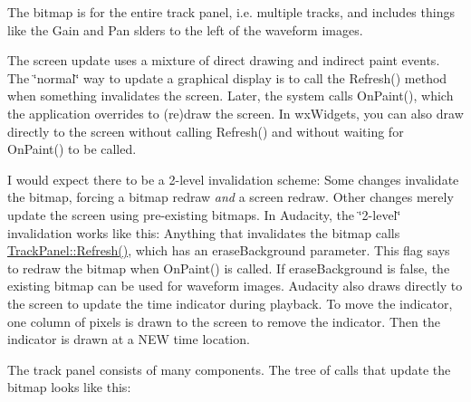 The bitmap is for the entire track panel, i.\+e. multiple tracks, and includes things like the Gain and Pan slders to the left of the waveform images.

The screen update uses a mixture of direct drawing and indirect paint events. The \char`\"{}normal\char`\"{} way to update a graphical display is to call the Refresh() method when something invalidates the screen. Later, the system calls On\+Paint(), which the application overrides to (re)draw the screen. In wx\+Widgets, you can also draw directly to the screen without calling Refresh() and without waiting for On\+Paint() to be called.

I would expect there to be a 2-\/level invalidation scheme\+: Some changes invalidate the bitmap, forcing a bitmap redraw {\itshape and} a screen redraw. Other changes merely update the screen using pre-\/existing bitmaps. In Audacity, the \char`\"{}2-\/level\char`\"{} invalidation works like this\+: Anything that invalidates the bitmap calls \hyperlink{class_track_panel_ae81fd0fd442170965441800734fcf212}{Track\+Panel\+::\+Refresh()}, which has an erase\+Background parameter. This flag says to redraw the bitmap when On\+Paint() is called. If erase\+Background is false, the existing bitmap can be used for waveform images. Audacity also draws directly to the screen to update the time indicator during playback. To move the indicator, one column of pixels is drawn to the screen to remove the indicator. Then the indicator is drawn at a N\+EW time location.

The track panel consists of many components. The tree of calls that update the bitmap looks like this\+:


